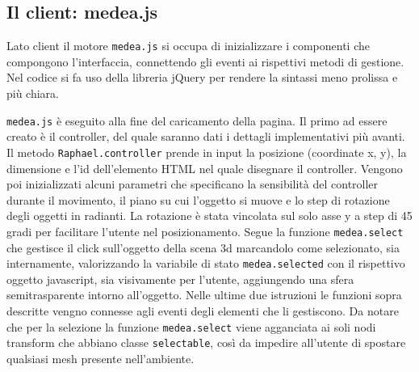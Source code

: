 \subsection{Il client: medea.js}
Lato client il motore \texttt{medea.js} si occupa di inizializzare i componenti che compongono l'interfaccia, connettendo gli eventi ai rispettivi metodi di gestione. Nel codice si fa uso della libreria jQuery per rendere la sintassi meno prolissa e più chiara.


\texttt{medea.js} è eseguito alla fine del caricamento della pagina. Il primo ad essere creato è il controller, del quale saranno dati i dettagli implementativi più avanti. Il metodo \texttt{Raphael.controller} prende in input la posizione (coordinate x, y), la dimensione e l'id dell'elemento HTML nel quale disegnare il controller. Vengono poi inizializzati alcuni parametri che specificano la sensibilità del controller durante il movimento, il piano su cui l'oggetto si muove e lo step di rotazione degli oggetti in radianti. La rotazione è stata vincolata sul solo asse y a step di 45 gradi per facilitare l'utente nel posizionamento. Segue la funzione \texttt{medea.select} che gestisce il click sull'oggetto della scena 3d marcandolo come selezionato, sia internamente, valorizzando la variabile di stato \texttt{medea.selected} con il rispettivo oggetto javascript, sia visivamente per l'utente, aggiungendo una sfera semitrasparente intorno all'oggetto. Nelle ultime due istruzioni le funzioni sopra descritte vengno connesse agli eventi degli elementi che li gestiscono. Da notare che per la selezione la funzione \texttt{medea.select} viene agganciata ai soli nodi transform che abbiano classe \texttt{selectable}, così da impedire all'utente di spostare qualsiasi mesh presente nell'ambiente.

